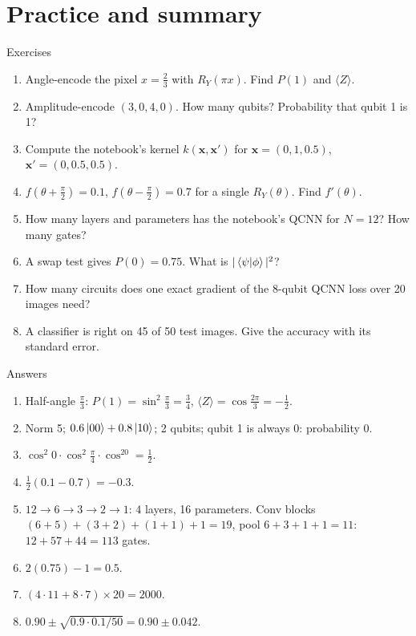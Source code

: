 \documentclass[aspectratio=169,11pt]{beamer}
\newcommand{\bx}{\mathbf x}
\begin{document}
\section{Practice and summary}
\begin{frame}{Exercises}
  \begin{enumerate}\small
    \item Angle-encode the pixel $x = \frac23$ with $R_Y(\pi x)$. Find $P(1)$ and $\langle Z\rangle$.
    \item Amplitude-encode $(3, 0, 4, 0)$. How many qubits? Probability that qubit 1 is 1?
    \item Compute the notebook's kernel $k(\bx, \bx')$ for $\bx = (0, 1, 0.5)$, $\bx' = (0, 0.5, 0.5)$.
    \item $f(\theta + \frac\pi2) = 0.1$, $f(\theta - \frac\pi2) = 0.7$ for a single $R_Y(\theta)$. Find $f'(\theta)$.
    \item How many layers and parameters has the notebook's QCNN for $N = 12$? How many gates?
    \item A swap test gives $P(0) = 0.75$. What is $|\braket{\psi|\phi}|^2$?
    \item How many circuits does one exact gradient of the 8-qubit QCNN loss over 20 images need?
    \item A classifier is right on 45 of 50 test images. Give the accuracy with its standard error.
  \end{enumerate}
\end{frame}

\begin{frame}{Answers}
  \small
  \begin{enumerate}
    \item Half-angle $\frac\pi3$: $P(1) = \sin^2\frac\pi3 = \frac34$, $\langle Z\rangle = \cos\frac{2\pi}3 = -\frac12$.
    \item Norm 5; $0.6\ket{00} + 0.8\ket{10}$; 2 qubits; qubit 1 is always 0: probability 0.
    \item $\cos^2 0\cdot\cos^2\frac\pi4\cdot\cos^20 = \frac12$.
    \item $\frac12(0.1 - 0.7) = -0.3$.
    \item $12 \to 6 \to 3 \to 2 \to 1$: 4 layers, 16 parameters. Conv blocks $(6 + 5) + (3 + 2) + (1 + 1) + 1 = 19$, pool $6 + 3 + 1 + 1 = 11$: $12 + 57 + 44 = 113$ gates.
    \item $2(0.75) - 1 = 0.5$.
    \item $(4\cdot11 + 8\cdot7)\times20 = 2000$.
    \item $0.90 \pm \sqrt{0.9\cdot0.1/50} = 0.90 \pm 0.042$.
  \end{enumerate}
\end{frame}
\end{document}
